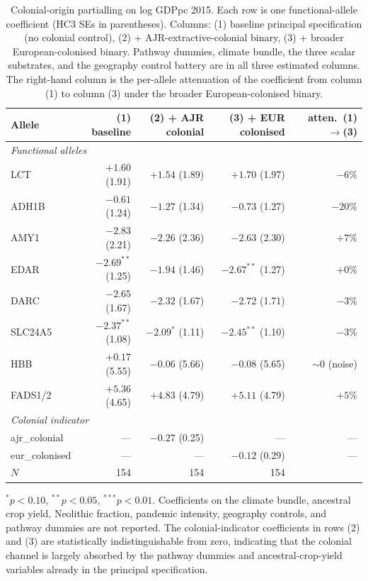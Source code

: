 \documentclass[11pt,letterpaper]{article}
\begin{document}
\begin{table}[H]
\centering
\caption{Colonial-origin partialling on log GDPpc 2015. Each row is one functional-allele coefficient (HC3 SEs in parentheses). Columns: (1) baseline principal specification (no colonial control), (2) + AJR-extractive-colonial binary, (3) + broader European-colonised binary. Pathway dummies, climate bundle, the three scalar substrates, and the geography control battery are in all three estimated columns. The right-hand column is the per-allele attenuation of the coefficient from column (1) to column (3) under the broader European-colonised binary.}
\label{tab:colonial-partial}
\small
\begin{tabular}{lrrrr}
\toprule
Allele & (1) baseline & (2) + AJR colonial & (3) + EUR colonised & atten.\ (1)$\to$(3) \\
\midrule
\multicolumn{5}{l}{\textit{Functional alleles}}\\
LCT       & $+1.60$ (1.91) & $+1.54$ (1.89) & $+1.70$ (1.97) & $-6\%$ \\
ADH1B     & $-0.61$ (1.24) & $-1.27$ (1.34) & $-0.73$ (1.27) & $-20\%$ \\
AMY1      & $-2.83$ (2.21) & $-2.26$ (2.36) & $-2.63$ (2.30) & $+7\%$ \\
EDAR      & $-2.69^{**}$ (1.25) & $-1.94$ (1.46) & $-2.67^{**}$ (1.27) & $+0\%$ \\
DARC      & $-2.65$ (1.67) & $-2.32$ (1.67) & $-2.72$ (1.71) & $-3\%$ \\
SLC24A5   & $-2.37^{**}$ (1.08) & $-2.09^{*}$ (1.11) & $-2.45^{**}$ (1.10) & $-3\%$ \\
HBB       & $+0.17$ (5.55) & $-0.06$ (5.66) & $-0.08$ (5.65) & $\sim$0 (noise)\\
FADS1/2   & $+5.36$ (4.65) & $+4.83$ (4.79) & $+5.11$ (4.79) & $+5\%$ \\
\midrule
\multicolumn{5}{l}{\textit{Colonial indicator}}\\
ajr\_colonial & --- & $-0.27$ (0.25) & --- & --- \\
eur\_colonised & --- & --- & $-0.12$ (0.29) & --- \\
\midrule
$N$ & 154 & 154 & 154 & \\
\bottomrule
\end{tabular}
\par\smallskip\footnotesize{$^*p<0.10$, $^{**}p<0.05$, $^{***}p<0.01$. Coefficients on the climate bundle, ancestral crop yield, Neolithic fraction, pandemic intensity, geography controls, and pathway dummies are not reported. The colonial-indicator coefficients in rows (2) and (3) are statistically indistinguishable from zero, indicating that the colonial channel is largely absorbed by the pathway dummies and ancestral-crop-yield variables already in the principal specification.}
\end{table}
\end{document}
